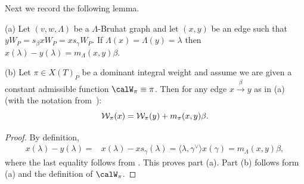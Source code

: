 Next we record the following lemma.
\begin{lemma}\label{maxP} (a) Let $(v,w,\Lambda)$ be a  $\Lambda$-Bruhat graph and let $(x,y)$ be an edge such that
$yW_P = s_\beta x W_P = x s_\gamma W_P$. If $\Lambda(x)=\Lambda(y)=\lambda$ then
$x(\lambda) - y (\lambda) = m_\Lambda(x,y) \beta$.

(b) Let $\pi \in X(T)_P$ be a dominant integral weight and assume we are given a constant admissible function $\calW_\pi \equiv \pi$.
Then for any edge $x\overset{\beta}{\to} y$ as in (a) (with the notation from~): 
\begin{equation}\label{E:Wla} 
\mathcal{W}_\pi(x) = \mathcal{W}_\pi(y) + m_\pi(x,y) \beta \/.
\end{equation}
\end{lemma}
\begin{proof} 
By definition,
\begin{align*}
x(\lambda) - y (\lambda)=& x(\lambda)-xs_\gamma(\lambda)
=\langle \lambda,\gamma^\vee\rangle x(\gamma)
=m_\Lambda(x,y) \beta,
\end{align*}
where the last equality follows from . This proves part (a). Part (b) follows form (a) and 
the definition of $\calW_\pi$.\end{proof}

